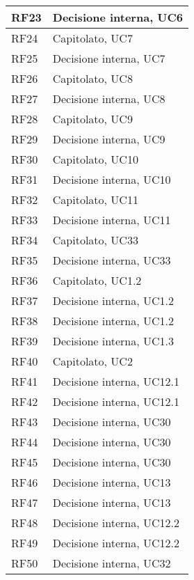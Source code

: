 \begin{center}
\begin{longtable}{|C{5cm}|C{5cm}|}
        \hline
        RF23 & Decisione interna, UC6 \\
        \hline
        RF24 & Capitolato, UC7 \\
        \hline
        RF25 & Decisione interna, UC7 \\
        \hline
        RF26 & Capitolato, UC8 \\
        \hline
        RF27 & Decisione interna, UC8 \\
        \hline
        RF28 & Capitolato, UC9 \\
        \hline
        RF29 & Decisione interna, UC9 \\
        \hline
        RF30 & Capitolato, UC10 \\
        \hline
        RF31 & Decisione interna, UC10 \\
        \hline
        RF32 & Capitolato, UC11 \\
        \hline
        RF33 & Decisione interna, UC11 \\
        \hline
        RF34 & Capitolato, UC33 \\
        \hline
        RF35 & Decisione interna, UC33 \\
        \hline
        RF36 & Capitolato, UC1.2 \\
        \hline
        RF37 & Decisione interna, UC1.2 \\
        \hline
        RF38 & Decisione interna, UC1.2 \\
        \hline
        RF39 & Decisione interna, UC1.3 \\
        \hline
        RF40 & Capitolato, UC2 \\
        \hline
        RF41 & Decisione interna, UC12.1 \\
        \hline
        RF42 & Decisione interna, UC12.1 \\
        \hline
        RF43 & Decisione interna, UC30 \\
        \hline
        RF44 & Decisione interna, UC30 \\
        \hline
        RF45 & Decisione interna, UC30 \\
        \hline
        RF46 & Decisione interna, UC13 \\
        \hline
        RF47 & Decisione interna, UC13 \\
        \hline
        RF48 & Decisione interna, UC12.2 \\
        \hline
        RF49 & Decisione interna, UC12.2 \\
        \hline
        RF50 & Decisione interna, UC32 \\

\end{longtable}
\end{center}

